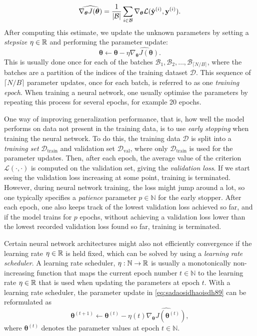 \documentclass{statsmsc}
\begin{document}
{\begin{equation}
    \widehat{\nabla_{\bm\theta} J(\bm\theta)} = \frac{1}{|\mathcal{B}|} \sum_{i \in \mathcal{B}}
    \nabla_{\bm\theta} \mathcal{L}(\hat{\mathbf{y}}^{(i)}, {\mathbf{y}}^{(i)}).
\end{equation}
After computing this estimate, we update the unknown parameters by setting a \textit{stepsize}
$\eta \in \mathbb{R}$ and performing the parameter update:
\begin{equation}\label{eq:sadaosidhaoisdh89}
    \bm\theta \leftarrow \bm\theta - \eta \widehat{\nabla_{\bm\theta} J(\bm\theta)}.
\end{equation}
This is usually done once for each of the batches
$\mathcal{B}_1,\mathcal{B}_2,\dots, \mathcal{B}_{\lceil N / B \rceil}$, where
the batches are a partition of the indices of the training dataset
$\mathcal{D}$. This sequence of $\lceil N / B \rceil$ parameter updates, once for each batch, is
referred to as one \textit{training epoch}.
When training a neural network, one usually optimise the parameters by repeating this process
for several epochs, for example 20 epochs.


One way of improving generalization performance, that is, how well the model performs on data
not present in the training data, is to use \textit{early stopping} when training the neural
network. To do this, the training data $\mathcal{D}$ is split into a \textit{training set}
$\mathcal{D}_{\textrm{train}}$ and validation set $\mathcal{D}_{\textrm{val}}$, where only
$\mathcal{D}_{\textrm{train}}$ is used for the parameter updates.
Then, after each epoch, the average value of the criterion $\mathcal{L}(\cdot,\cdot)$ is computed on
the validation set, giving the \textit{validation loss}. If we start seeing the validation loss
increasing at some point, training is terminated. However, during neural network training, the loss
might jump around a lot, so one typically specifies a
\textit{patience} parameter $p\in\mathbb{N}$
for the early stopper. After each epoch, one also keeps track of the lowest validation loss achieved
so far, and if the model trains for $p$ epochs, without achieving a validation
loss lower than the lowest recorded validation loss found so far, training is terminated.

Certain neural network architectures might also not efficiently convergence if the learning
rate $\eta \in \mathbb{R}$ is held fixed, which can be solved by using a \textit{learning rate scheduler}.
A learning rate scheduler, $\eta: \mathbb{N} \rightarrow {\mathbb{R}}$ is usually a
monotonically non-increasing function that maps the current epoch number $t \in \mathbb{N}$
to the learning rate $\eta \in \mathbb{R}$ that is used when updating the parameters at epoch $t$. With
a learning rate scheduler, the parameter update in \cref{eq:sadaosidhaoisdh89} can be reformulated
as
\begin{equation}
    \bm\theta^{(t+1)} \leftarrow \bm\theta^{(t)} - \eta(t) \widehat{\nabla_{\bm\theta} J\left(\bm\theta^{(t)}\right)},
\end{equation}
where $\bm\theta^{(t)}$ denotes the parameter values at epoch $t \in \mathbb{N}$.

}
\end{document}
